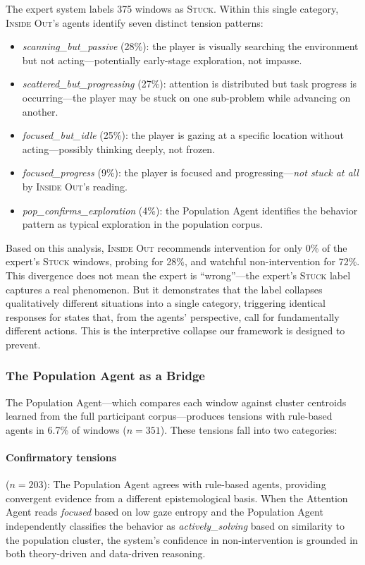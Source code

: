 The expert system labels 375 windows as \textsc{Stuck}. Within this single category, \textsc{Inside Out}'s agents identify seven distinct tension patterns:

\begin{itemize}
    \item \emph{scanning\_but\_passive} (28\%): the player is visually searching the environment but not acting---potentially early-stage exploration, not impasse.
    \item \emph{scattered\_but\_progressing} (27\%): attention is distributed but task progress is occurring---the player may be stuck on one sub-problem while advancing on another.
    \item \emph{focused\_but\_idle} (25\%): the player is gazing at a specific location without acting---possibly thinking deeply, not frozen.
    \item \emph{focused\_progress} (9\%): the player is focused and progressing---\emph{not stuck at all} by \textsc{Inside Out}'s reading.
    \item \emph{pop\_confirms\_exploration} (4\%): the Population Agent identifies the behavior pattern as typical exploration in the population corpus.
\end{itemize}

Based on this analysis, \textsc{Inside Out} recommends intervention for only 0\% of the expert's \textsc{Stuck} windows, probing for 28\%, and watchful non-intervention for 72\%. This divergence does not mean the expert is ``wrong''---the expert's \textsc{Stuck} label captures a real phenomenon. But it demonstrates that the label collapses qualitatively different situations into a single category, triggering identical responses for states that, from the agents' perspective, call for fundamentally different actions. This is the interpretive collapse our framework is designed to prevent.

\subsubsection{The Population Agent as a Bridge}

The Population Agent---which compares each window against cluster centroids learned from the full participant corpus---produces tensions with rule-based agents in 6.7\% of windows ($n = 351$). These tensions fall into two categories:

\paragraph{Confirmatory tensions} ($n = 203$): The Population Agent agrees with rule-based agents, providing convergent evidence from a different epistemological basis. When the Attention Agent reads \emph{focused} based on low gaze entropy and the Population Agent independently classifies the behavior as \emph{actively\_solving} based on similarity to the population cluster, the system's confidence in non-intervention is grounded in both theory-driven and data-driven reasoning.

